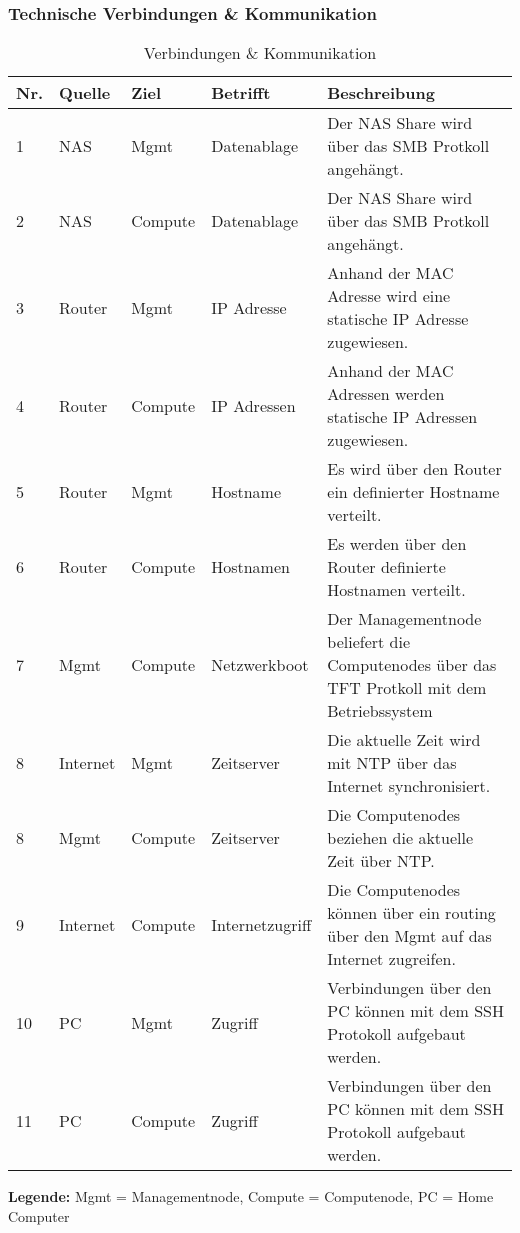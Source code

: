 \subsubsection{Technische Verbindungen \& Kommunikation}
\begin{table}[H]
\centering
\begin{tabular}{p{1cm}p{1.5cm}p{1.5cm}p{2.2cm}p{9.8cm}}
\hline
\rowcolor{heading} \textbf{Nr.} & \textbf{Quelle} & \textbf{Ziel }& \textbf{Betrifft} & \textbf{Beschreibung} \\\hline
1 & NAS & Mgmt & Datenablage & Der NAS Share wird über das SMB Protkoll angehängt. \\\hline
2 & NAS & Compute & Datenablage & Der NAS Share wird über das SMB Protkoll angehängt. \\\hline
3 & Router & Mgmt & IP Adresse & Anhand der MAC Adresse wird eine statische IP Adresse zugewiesen. \\\hline
4 & Router & Compute & IP Adressen & Anhand der MAC Adressen werden statische IP Adressen zugewiesen. \\\hline
5 & Router & Mgmt &Hostname & Es wird über den Router ein definierter Hostname verteilt. \\\hline
6 & Router & Compute & Hostnamen & Es werden über den Router definierte Hostnamen verteilt. \\\hline
7 & Mgmt & Compute & Netzwerkboot & Der Managementnode beliefert die Computenodes über das TFT Protkoll mit dem Betriebssystem \\\hline
8 & Internet & Mgmt & Zeitserver & Die aktuelle Zeit wird mit NTP über das Internet synchronisiert.\\\hline
8 & Mgmt & Compute & Zeitserver & Die Computenodes beziehen die aktuelle Zeit über NTP.\\\hline
9 & Internet & Compute & Internetzugriff & Die Computenodes können über ein routing über den Mgmt auf das Internet zugreifen. \\\hline
10 & PC & Mgmt & Zugriff & Verbindungen über den PC können mit dem SSH Protokoll aufgebaut werden. \\\hline
11 & PC & Compute & Zugriff & Verbindungen über den PC können mit dem SSH Protokoll aufgebaut werden. \\\hline
\end{tabular}
\caption{Verbindungen \& Kommunikation}
\end{table}
\textbf{Legende:} Mgmt = Managementnode, Compute = Computenode, PC = Home Computer

\newpage
